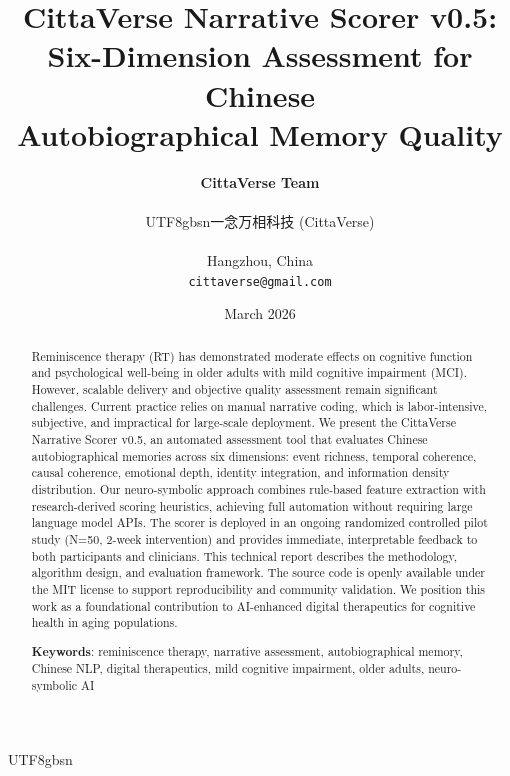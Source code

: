 \documentclass[11pt]{article}
\begin{document}
\begin{CJK}{UTF8}{gbsn}

\title{\textbf{CittaVerse Narrative Scorer v0.5:\\Six-Dimension Assessment for Chinese\\Autobiographical Memory Quality}}

\author{
    \textbf{CittaVerse Team} \\
    \begin{CJK}{UTF8}{gbsn}一念万相科技 (CittaVerse)\end{CJK} \\
    Hangzhou, China \\
    \texttt{cittaverse@gmail.com}
}

\date{March 2026}

\maketitle

\end{CJK}

\begin{abstract}
\noindent Reminiscence therapy (RT) has demonstrated moderate effects on cognitive function and psychological well-being in older adults with mild cognitive impairment (MCI). However, scalable delivery and objective quality assessment remain significant challenges. Current practice relies on manual narrative coding, which is labor-intensive, subjective, and impractical for large-scale deployment. We present the CittaVerse Narrative Scorer v0.5, an automated assessment tool that evaluates Chinese autobiographical memories across six dimensions: event richness, temporal coherence, causal coherence, emotional depth, identity integration, and information density distribution. Our neuro-symbolic approach combines rule-based feature extraction with research-derived scoring heuristics, achieving full automation without requiring large language model APIs. The scorer is deployed in an ongoing randomized controlled pilot study (N=50, 2-week intervention) and provides immediate, interpretable feedback to both participants and clinicians. This technical report describes the methodology, algorithm design, and evaluation framework. The source code is openly available under the MIT license to support reproducibility and community validation. We position this work as a foundational contribution to AI-enhanced digital therapeutics for cognitive health in aging populations.

\vspace{0.5em}
\noindent\textbf{Keywords}: reminiscence therapy, narrative assessment, autobiographical memory, Chinese NLP, digital therapeutics, mild cognitive impairment, older adults, neuro-symbolic AI
\end{abstract}
\end{document}
